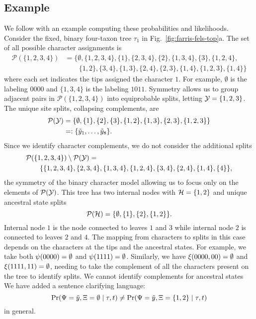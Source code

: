 \subsection*{Example}
We follow with an example computing these probabilities and likelihoods.
Consider the fixed, binary four-taxon tree $\tau_1$ in Fig.~\ref{fig:farris-fels-top}a.
The set of all possible character assignments is
\begin{align*}
\mathcal{P}(\{1,2,3,4\}) &= \{\emptyset, \{1,2,3,4\}, \{1\}, \{2,3,4\}, \{2\}, \{1,3,4\}, \{3\}, \{1,2,4\}, \\
                         &\qquad \{1,2\}, \{3,4\}, \{1,3\}, \{2,4\}, \{2,3\}, \{1,4\}, \{1,2,3\}, \{1,4\}\}
\end{align*}
where each set indicates the tips assigned the character $1$.
For example, $\emptyset$ is the labeling $0000$ and $\{1,3,4\}$ is the labeling $1011$.
Symmetry allows us to group adjacent pairs in $\mathcal{P}(\{1,2,3,4\})$ into equiprobable splits, letting $\mathcal{Y}=\{1,2,3\}$.
The unique site splits, collapsing complements, are
\begin{align*}
    \mathcal{P}(\mathcal{Y}) &= \{\emptyset, \{1\}, \{2\}, \{3\}, \{1,2\}, \{1,3\}, \{2,3\}, \{1,2,3\}\} \\
& =: \{\tilde{y}_1, \ldots, \tilde{y}_8\}.
\end{align*}
Since we identify character complements, we do not consider the additional splits
\begin{equation*}
\begin{split}
& \mathcal{P}(\{1,2,3,4\}) \setminus \mathcal{P}(\mathcal{Y}) = \\
&\qquad \{\{1,2,3,4\}, \{2,3,4\}, \{1,3,4\}, \{1,2,4\}, \{3,4\}, \{2,4\}, \{1,4\}, \{4\}\},
\end{split}
\end{equation*}
the symmetry of the binary character model allowing us to focus only on the elements of $\mathcal{P}(\mathcal{Y})$.
This tree has two internal nodes with $\mathcal{H}=\{1,2\}$ and unique ancestral state splits
\[
\mathcal{P}(\mathcal{H}) = \{\emptyset, \{1\}, \{2\}, \{1,2\}\}.
\]
Internal node $1$ is the node connected to leaves $1$ and $3$ while internal node $2$ is connected to leaves $2$ and $4$.
The mapping from characters to splits in this case depends on the characters at the tips and the ancestral states.
For example, we take both $\psi(0000)=\emptyset$ and $\psi(1111)=\emptyset$.
Similarly, we have $\xi(0000, 00) = \emptyset$ and $\xi(1111, 11)=\emptyset$, needing to take the complement of all the characters present on the tree to identify splits.
We cannot identify complements for ancestral states We have added a sentence clarifying language:
\[
\Pr(\Psi=\tilde{y}, \Xi=\emptyset \mid \tau, t)\neq \Pr(\Psi=\tilde{y}, \Xi=\{1,2\} \mid \tau, t)
\]
in general.

